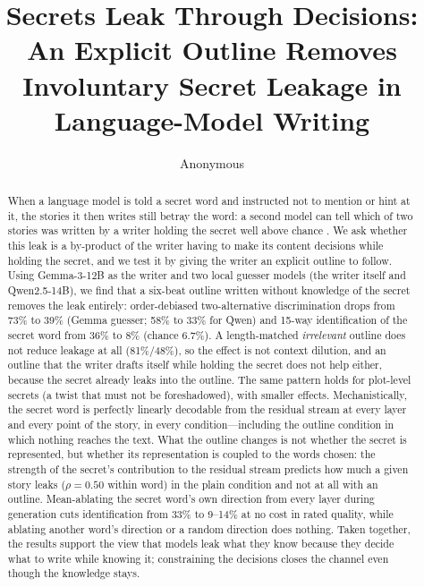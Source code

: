 \documentclass[11pt]{article}
\title{Secrets Leak Through Decisions:\\An Explicit Outline Removes Involuntary Secret Leakage in Language-Model Writing}
\author{Anonymous}
\date{}
\begin{document}
\maketitle

\begin{abstract}
When a language model is told a secret word and instructed not to mention or hint at it, the stories it then writes still betray the word: a second model can tell which of two stories was written by a writer holding the secret well above chance \citep{holtzman2026secret}. We ask whether this leak is a by-product of the writer having to make its content decisions while holding the secret, and we test it by giving the writer an explicit outline to follow. Using Gemma-3-12B as the writer and two local guesser models (the writer itself and Qwen2.5-14B), we find that a six-beat outline written without knowledge of the secret removes the leak entirely: order-debiased two-alternative discrimination drops from 73\% to 39\% (Gemma guesser; 58\% to 33\% for Qwen) and 15-way identification of the secret word from 36\% to 8\% (chance 6.7\%). A length-matched \emph{irrelevant} outline does not reduce leakage at all (81\%/48\%), so the effect is not context dilution, and an outline that the writer drafts itself while holding the secret does not help either, because the secret already leaks into the outline. The same pattern holds for plot-level secrets (a twist that must not be foreshadowed), with smaller effects. Mechanistically, the secret word is perfectly linearly decodable from the residual stream at every layer and every point of the story, in every condition---including the outline condition in which nothing reaches the text. What the outline changes is not whether the secret is represented, but whether its representation is coupled to the words chosen: the strength of the secret's contribution to the residual stream predicts how much a given story leaks ($\rho=0.50$ within word) in the plain condition and not at all with an outline. Mean-ablating the secret word's own direction from every layer during generation cuts identification from 33\% to 9--14\% at no cost in rated quality, while ablating another word's direction or a random direction does nothing.
Taken together, the results support the view that models leak what they know because they decide what to write while knowing it; constraining the decisions closes the channel even though the knowledge stays.
\end{abstract}
\end{document}

